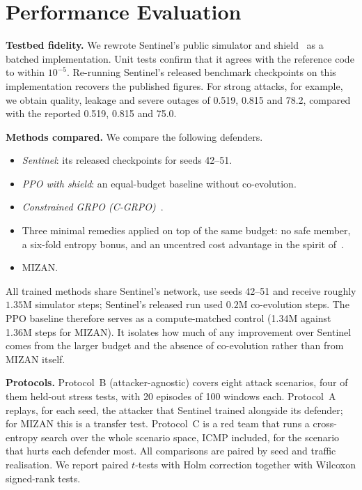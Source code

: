 \documentclass[conference]{IEEEtran}
\begin{document}
\section{Performance Evaluation}
\label{sec:eval}
\textbf{Testbed fidelity.} We rewrote Sentinel's public simulator and shield~\cite{sentinelcode} as a batched implementation. Unit tests confirm that it agrees with the reference code to within $10^{-5}$. Re-running Sentinel's released benchmark checkpoints on this implementation recovers the published figures. For strong attacks, for example, we obtain quality, leakage and severe outages of 0.519, 0.815 and 78.2, compared with the reported 0.519, 0.815 and 75.0.

\textbf{Methods compared.} We compare the following defenders.
\begin{itemize}
\item \emph{Sentinel}: its released checkpoints for seeds 42--51.
\item \emph{PPO with shield}: an equal-budget baseline without co-evolution.
\item \emph{Constrained GRPO (C-GRPO)}~\cite{girgis2026cgrpo}.
\item Three minimal remedies applied on top of the same budget: no safe member, a six-fold entropy bonus, and an uncentred cost advantage in the spirit of~\cite{nie2026starvation}.
\item MIZAN.
\end{itemize}
All trained methods share Sentinel's network, use seeds 42--51 and receive roughly $1.35$M simulator steps; Sentinel's released run used $0.2$M co-evolution steps. The PPO baseline therefore serves as a compute-matched control (1.34M against 1.36M steps for MIZAN). It isolates how much of any improvement over Sentinel comes from the larger budget and the absence of co-evolution rather than from MIZAN itself.

\textbf{Protocols.} Protocol~B (attacker-agnostic) covers eight attack scenarios, four of them held-out stress tests, with 20 episodes of 100 windows each. Protocol~A replays, for each seed, the attacker that Sentinel trained alongside its defender; for MIZAN this is a transfer test. Protocol~C is a red team that runs a cross-entropy search over the whole scenario space, ICMP included, for the scenario that hurts each defender most. All comparisons are paired by seed and traffic realisation. We report paired $t$-tests with Holm correction together with Wilcoxon signed-rank tests.
\end{document}
